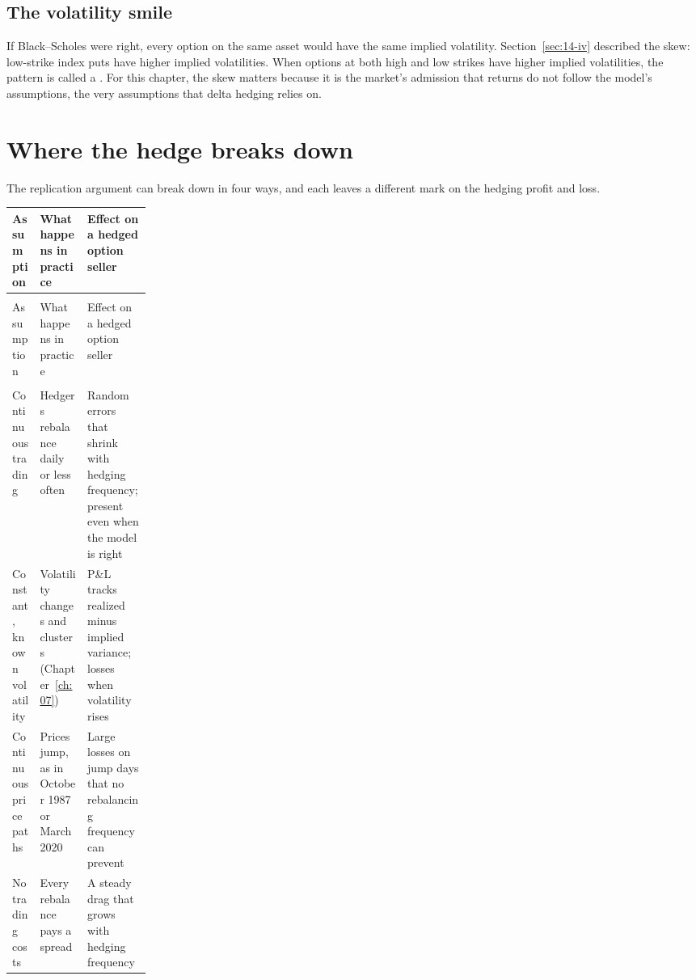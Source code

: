 \subsection{The volatility smile}

If Black--Scholes were right, every option on the same asset would have the same implied volatility. Section~\ref{sec:14-iv} described the skew: low-strike index puts have higher implied volatilities. When options at both high and low strikes have higher implied volatilities, the pattern is called a . For this chapter, the skew matters because it is the market's admission that returns do not follow the model's assumptions, the very assumptions that delta hedging relies on.


\section{Where the hedge breaks down}
\label{sec:14-how}

The replication argument can break down in four ways, and each leaves a different mark on the hedging profit and loss.

\begingroup
\small
\setlength{\LTpre}{6pt}\setlength{\LTpost}{6pt}
\begin{longtable}{@{}>{\raggedright\arraybackslash}p{0.2\linewidth}>{\raggedright\arraybackslash}p{}>{\raggedright\arraybackslash}p{}@{}}
\toprule
Assumption & What happens in practice & Effect on a hedged option seller \\
\midrule
\endfirsthead
\multicolumn{3}{@{}l}{\emph{(continued)}} \\
\toprule
Assumption & What happens in practice & Effect on a hedged option seller \\
\midrule
\endhead
\midrule
\multicolumn{3}{r@{}}{\emph{(continued on the next page)}} \\
\endfoot
\bottomrule
\endlastfoot
Continuous trading & Hedgers rebalance daily or less often & Random errors that shrink with hedging frequency; present even when the model is right \\*
Constant, known volatility & Volatility changes and clusters (Chapter~\ref{ch:07}) & P\&L tracks realized minus implied variance; losses when volatility rises \\
Continuous price paths & Prices jump, as in October 1987 or March 2020 & Large losses on jump days that no rebalancing frequency can prevent \\*
No trading costs & Every rebalance pays a spread & A steady drag that grows with hedging frequency \\
\end{longtable}
\addtocounter{table}{-1}%
\endgroup

